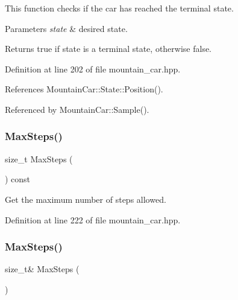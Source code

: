 This function checks if the car has reached the terminal state. 


\begin{DoxyParams}{Parameters}
{\em state} & desired state. \\
\hline
\end{DoxyParams}
\begin{DoxyReturn}{Returns}
true if state is a terminal state, otherwise false. 
\end{DoxyReturn}


Definition at line 202 of file mountain\+\_\+car.\+hpp.



References Mountain\+Car\+::\+State\+::\+Position().



Referenced by Mountain\+Car\+::\+Sample().

\mbox{\label{classmlpack_1_1rl_1_1MountainCar_ad8fd6d8f7581c82e73556491b79a8907}} 
\subsubsection{Max\+Steps()\hspace{0.1cm}{\footnotesize\ttfamily [1/2]}}
{\footnotesize\ttfamily size\+\_\+t Max\+Steps (\begin{DoxyParamCaption}{ }\end{DoxyParamCaption}) const\hspace{0.3cm}{\ttfamily [inline]}}



Get the maximum number of steps allowed. 



Definition at line 222 of file mountain\+\_\+car.\+hpp.

\mbox{\label{classmlpack_1_1rl_1_1MountainCar_a64c84cebc489c6fdfd7f057e127b0aef}} 
\subsubsection{Max\+Steps()\hspace{0.1cm}{\footnotesize\ttfamily [2/2]}}
{\footnotesize\ttfamily size\+\_\+t\& Max\+Steps (\begin{DoxyParamCaption}{ }\end{DoxyParamCaption})\hspace{0.3cm}{\ttfamily [inline]}}



